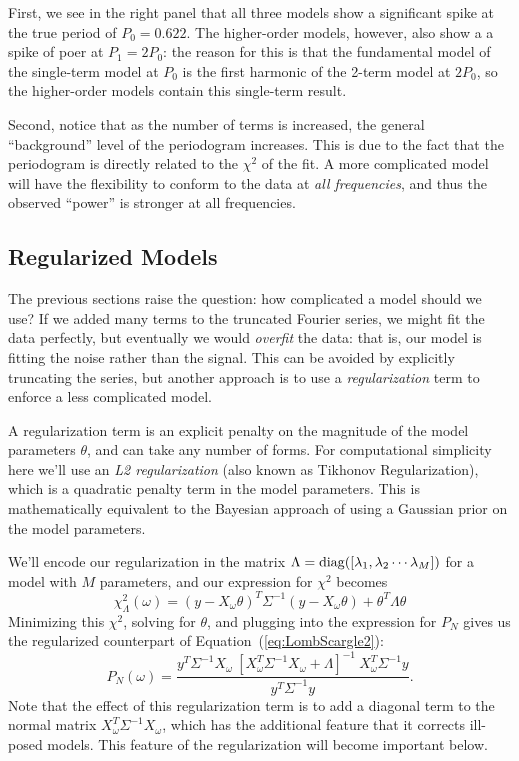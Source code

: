 \documentclass[12pt,preprint]{aastex}
\newcommand{\Eq}[1]{Equation~(\ref{eq:#1})}
\newcommand{\eq}[1]{\Eq{#1}}
\newcommand{\eqlabel}[1]{\label{eq:#1}}
\newcommand{\sectlabel}[1]{\label{sect:#1}}
\begin{document}
First, we see in the right panel that all three models show a significant spike at the true period of $P_0 = 0.622$. The higher-order models, however, also show a a spike of poer at $P_1 = 2 P_0$: the reason for this is that the fundamental model of the single-term model at $P_0$ is the first harmonic of the 2-term model at $2P_0$, so the higher-order models contain this single-term result.

Second, notice that as the number of terms is increased, the general ``background'' level of the periodogram increases. This is due to the fact that the periodogram is directly related to the $\chi^2$ of the fit. A more complicated model will have the flexibility to conform to the data at {\it all frequencies}, and thus the observed ``power'' is stronger at all frequencies.

\subsection{Regularized Models}
\sectlabel{regularization}
The previous sections raise the question: how complicated a model should we use? If we added many terms to the truncated Fourier series, we might fit the data perfectly, but eventually we would {\it overfit} the data: that is, our model is fitting the noise rather than the signal. This can be avoided by explicitly truncating the series, but another approach is to use a {\it regularization} term to enforce a less complicated model.

A regularization term is an explicit penalty on the magnitude of the model parameters $\theta$, and can take any number of forms. For computational simplicity here we'll use an {\it L2 regularization} (also known as Tikhonov Regularization), which is a quadratic penalty term in the model parameters. This is mathematically equivalent to the Bayesian approach of using a Gaussian prior on the model parameters.

We'll encode our regularization in the matrix $\Lambda = {\rm diag}([\lambda_1, \lambda_2 \cdots \lambda_M])$ for a model with $M$ parameters, and our expression for $\chi^2$ becomes
\begin{equation}
  \eqlabel{chi2reg}
  \chi_\Lambda^2(\omega) = (y - X_\omega\theta)^T\Sigma^{-1}(y - X_\omega\theta) + \theta^T\Lambda\theta
\end{equation}
Minimizing this $\chi^2$, solving for $\theta$, and plugging into the expression for $P_N$ gives us the regularized counterpart of \eq{LombScargle2}:
\begin{equation}
  \eqlabel{LombScargleReg}
  P_N(\omega) = \frac{y^T\Sigma^{-1}X_\omega~[X_\omega^T\Sigma^{-1}X_\omega + \Lambda]^{-1}~X_\omega^T\Sigma^{-1}y}{y^T\Sigma^{-1}y}.
\end{equation}
Note that the effect of this regularization term is to add a diagonal term to the normal matrix $X_\omega^T\Sigma^{-1}X_\omega$, which has the additional feature that it corrects ill-posed models. This feature of the regularization will become important below.
\end{document}
